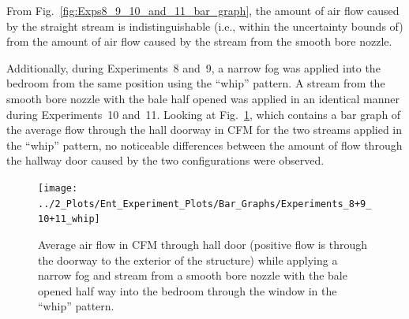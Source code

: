 \documentclass[12pt,oneside]{book}
\begin{document}
From Fig.~\ref{fig:Exps8_9_10_and_11_bar_graph}, the amount of air flow caused by the straight stream is indistinguishable (i.e., within the uncertainty bounds of) from the amount of air flow caused by the stream from the smooth bore nozzle.

Additionally, during Experiments~8 and~9, a narrow fog was applied into the bedroom from the same position using the ``whip'' pattern. A stream from the smooth bore nozzle with the bale half opened was applied in an identical manner during Experiments~10 and~11. Looking at Fig.~\ref{fig:Exps8_9_10_and_11_whip_bar_graph}, which contains a bar graph of the average flow through the hall doorway in CFM for the two streams applied in the ``whip'' pattern, no noticeable differences between the amount of flow through the hallway door caused by the two configurations were observed.
\\
\begin{figure}[H]
	\centering
	\texttt{[image: ../2\_Plots/Ent\_Experiment\_Plots/Bar\_Graphs/Experiments\_8+9\_10+11\_whip]}
	\caption{Average air flow in CFM through hall door (positive flow is through the doorway to the exterior of the structure) while applying a narrow fog and stream from a smooth bore nozzle with the bale opened half way into the bedroom through the window in the ``whip'' pattern.}
	\label{fig:Exps8_9_10_and_11_whip_bar_graph}
\end{figure}




\end{document}
